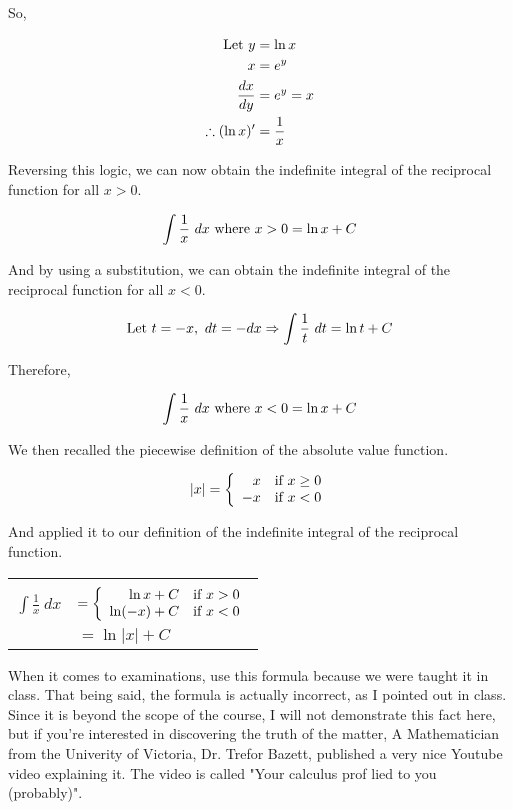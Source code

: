 \documentclass{article}
\begin{document}
So,

\begin{align*}
\textnormal{Let }y&=\ln x\\
x&=e^y\\
\frac{dx}{dy}&=e^y=x\\
\therefore(\ln x)^\prime&=\frac{1}{x}
\end{align*}

Reversing this logic, we can now obtain the indefinite integral of the reciprocal function for all $x>0$.

\[\int\frac{1}{x}\ dx\textnormal{ where } x>0=\ln x+C\]

And by using a substitution, we can obtain the indefinite integral of the reciprocal function for all $x<0$.

\[\textnormal{Let }t=-x,\ dt=-dx\Rightarrow\int\frac{1}{t}\ dt=\ln t+C\]

Therefore,

\[\int\frac{1}{x}\ dx\textnormal{ where } x<0=\ln x+C\]

We then recalled the piecewise definition of the absolute value function.

\[|x|=\left\{\begin{array}{rl}x&\textnormal{if }x\geq0\\-x&\textnormal{if }x<0\end{array}\right.\]

And applied it to our definition of the indefinite integral of the reciprocal function.

\begin{center}
\begin{tabular}{|rl|}
\hline&\\
$\displaystyle\int\frac{1}{x}\ dx$ & $=\left\{\begin{array}{rl}\ln x+C&\textnormal{if }x>0\\\ln(-x)+C&\textnormal{if }x<0\end{array}\right.$\\[1.5em]
& $\displaystyle=\ln|x|+C$\\[1em]
\hline
\end{tabular}
\end{center}

When it comes to examinations, use this formula because we were taught it in class. That being said, the formula is actually incorrect, as I pointed out in class. Since it is beyond the scope of the course, I will not demonstrate this fact here, but if you're interested in discovering the truth of the matter, A Mathematician from the Univerity of Victoria, Dr. Trefor Bazett, published a very nice Youtube video explaining it. The video is called "Your calculus prof lied to you (probably)".
\end{document}
